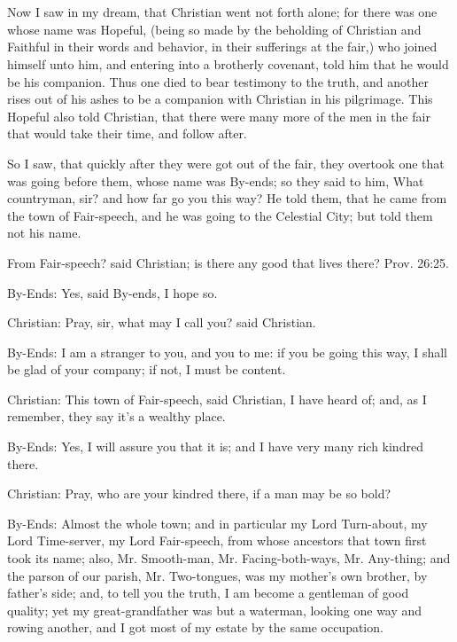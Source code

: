 \chapter[THE SEVENTH STAGE]{}

Now I saw in my dream, that Christian went not forth alone; for there was one whose name was Hopeful, (being so made by the beholding of Christian and Faithful in their words and behavior, in their sufferings at the fair,) who joined himself unto him, and entering into a brotherly covenant, told him that he would be his companion. Thus one died to bear testimony to the truth, and another rises out of his ashes to be a companion with Christian in his pilgrimage. This Hopeful also told Christian, that there were many more of the men in the fair that would take their time, and follow after.

So I saw, that quickly after they were got out of the fair, they overtook one that was going before them, whose name was By-ends; so they said to him, What countryman, sir? and how far go you this way? He told them, that he came from the town of Fair-speech, and he was going to the Celestial City; but told them not his name.

From Fair-speech? said Christian; is there any good that lives there? Prov. 26:25.

By-Ends: Yes, said By-ends, I hope so.

Christian: Pray, sir, what may I call you? said Christian.

By-Ends: I am a stranger to you, and you to me: if you be going this way, I shall be glad of your company; if not, I must be content.

Christian: This town of Fair-speech, said Christian, I have heard of; and, as I remember, they say it's a wealthy place.

By-Ends: Yes, I will assure you that it is; and I have very many rich kindred there.

Christian: Pray, who are your kindred there, if a man may be so bold?

By-Ends: Almost the whole town; and in particular my Lord Turn-about, my Lord Time-server, my Lord Fair-speech, from whose ancestors that town first took its name; also, Mr. Smooth-man, Mr. Facing-both-ways, Mr. Any-thing; and the parson of our parish, Mr. Two-tongues, was my mother's own brother, by father's side; and, to tell you the truth, I am become a gentleman of good quality; yet my great-grandfather was but a waterman, looking one way and rowing another, and I got most of my estate by the same occupation.

